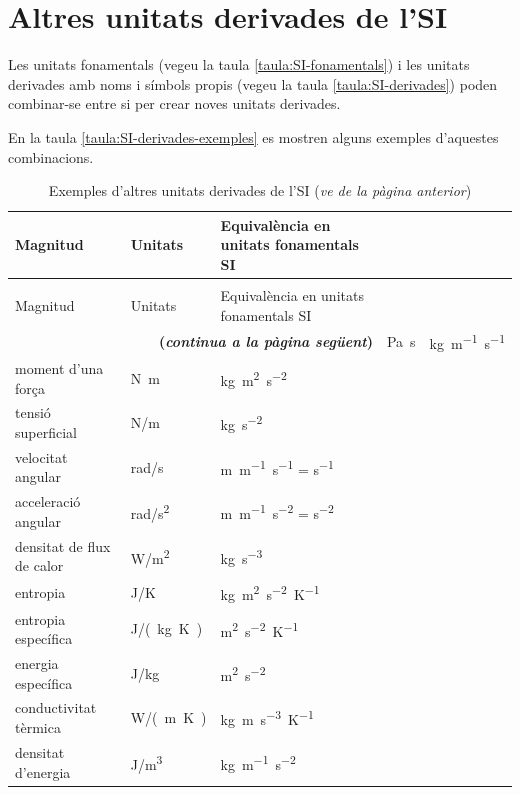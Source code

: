 \section{Altres unitats derivades de l'SI}

Les unitats fonamentals (vegeu la taula \vref{taula:SI-fonamentals}) i les unitats derivades amb noms i símbols propis (vegeu la taula \vref{taula:SI-derivades}) poden combinar-se entre si per crear noves unitats derivades.

 En la taula \vref{taula:SI-derivades-exemples} es mostren alguns exemples d'aquestes combinacions.

\begin{longtable}[h]{lll}
   \caption{\label{taula:SI-derivades-exemples} Exemples d'altres unitats derivades de
   l'SI}\\
   \toprule[1pt]
    Magnitud &  Unitats & Equivalència en unitats fonamentals SI\\
   \midrule
   \endfirsthead
   \caption[]{Exemples d'altres unitats derivades de l'SI (\emph{ve de la pàgina
   anterior})}\\
   \toprule[1pt]
    Magnitud &  Unitats & Equivalència en unitats fonamentals SI\\
   \midrule
   \endhead
   \midrule
   \multicolumn{3}{r}{\sffamily\bfseries\color{NavyBlue}(\emph{continua a la pàgina següent})}
   \endfoot
   \endlastfoot
   viscositat dinàmica &  \unit{Pa.s}& \unit{kg.m^{-1}.s^{-1}} \\
   moment d'una força & \unit{N.m} & \unit{kg.m^2.s^{-2}} \\
   tensió superficial &  \unit{N/m} &   \unit{kg.s^{-2}} \\
   velocitat angular & \unit{rad/s} & \unit{m.m^{-1}.s^{-1}} = \unit{s^{-1}} \\
   acceleració angular & \unit{rad/s^2} & \unit{m.m^{-1}.s^{-2}} = \unit{s^{-2}} \\
   densitat de flux de calor & \unit{W/m^2} & \unit{kg.s^{-3}} \\
   entropia & \unit{J/K} & \unit{kg.m^2.s^{-2}.K^{-1}} \\
   entropia específica & \unit{J/(kg.K)} &\unit{m^2.s^{-2}.K^{-1}} \\
   energia específica & \unit{J/kg} & \unit{m^2.s^{-2}} \\
   conductivitat tèrmica & \unit{W/(m.K)} & \unit{kg.m.s^{-3}.K^{-1}} \\
   densitat d'energia & \unit{J/m^3} & \unit{kg.m^{-1}.s^{-2}} \\

\end{longtable}
